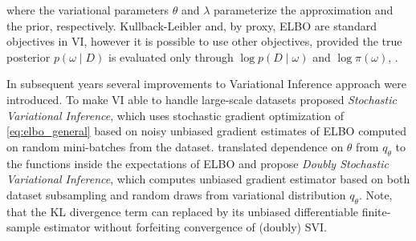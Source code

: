 \documentclass[a4paper,10pt,twocolumn]{article}
\begin{document}
where the variational parameters $\theta$ and $\lambda$ parameterize the approximation
and the prior, respectively.
%
Kullback-Leibler and, by proxy, ELBO are standard objectives in VI, however it is possible
to use other objectives, provided the true posterior $p(\omega \mid D)$ is evaluated only
through $\log p(D \mid \omega)$ and $\log \pi(\omega)$, \citep{ranganath_operator_2016}.

In subsequent years several improvements to Variational Inference approach were introduced.
To make VI able to handle large-scale datasets \citet{hoffman_stochastic_2013} proposed
\emph{Stochastic Variational Inference}, which uses stochastic gradient optimization of
\eqref{eq:elbo_general} based on noisy unbiased gradient estimates of ELBO
computed on random mini-batches from the dataset. \citet{titsias_doubly_2014} translated
dependence on $\theta$ from $q_{\theta}$ to the functions inside the expectations of ELBO
and propose \emph{Doubly Stochastic Variational Inference}, which computes unbiased gradient
estimator based on both dataset subsampling and random draws from variational distribution
$q_{\theta}$. Note, that the KL divergence term can replaced by its unbiased differentiable
finite-sample estimator without forfeiting convergence of (doubly) SVI.
\end{document}
